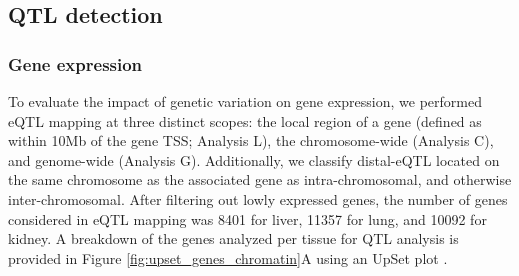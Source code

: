 \documentclass[9pt,twocolumn,twoside]{gsajnl}
\begin{document}
\subsection{QTL detection}

\subsubsection{Gene expression}
To evaluate the impact of genetic variation on gene expression, we performed eQTL mapping at three distinct scopes: the local region of a gene (defined as within 10Mb of the gene TSS; Analysis L), the chromosome-wide (Analysis C), and genome-wide (Analysis G). Additionally, we classify distal-eQTL located on the same chromosome as the associated gene as intra-chromosomal, and otherwise inter-chromosomal.
After filtering out lowly expressed genes, the number of genes considered in eQTL mapping was 8401 for liver, 11357 for lung, and 10092 for kidney. A breakdown of the genes analyzed per tissue for QTL analysis is provided in Figure \ref{fig:upset_genes_chromatin}A using an UpSet plot \citep{Conway2017}. 
\end{document}
